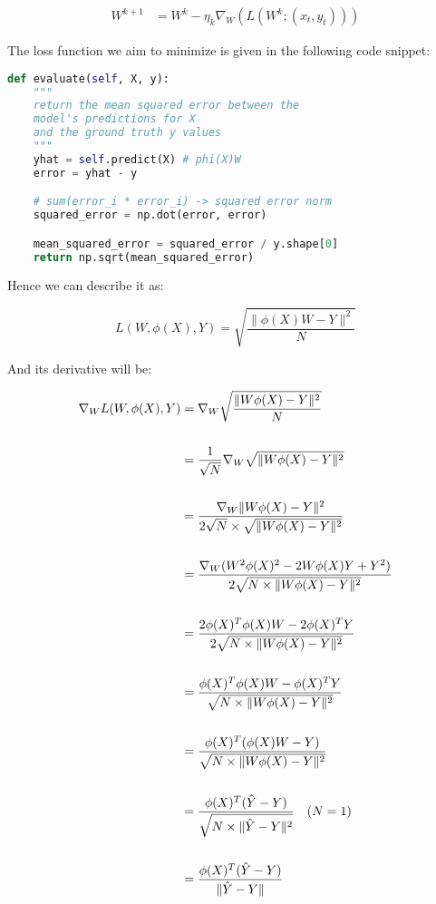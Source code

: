 \documentclass[10pt]{article}
\begin{document}
\begin{equation}
\begin{aligned}
W^{k+1} & {} = W^{k} - \eta_{k} \nabla_{W}(L(W^{k};(x_{t},y_{t})))
\end{aligned}
\end{equation}

The loss function we aim to minimize is given in the following code snippet:

\begin{lstlisting}[language=Python]
def evaluate(self, X, y):
    """
    return the mean squared error between the
    model's predictions for X
    and the ground truth y values
    """
    yhat = self.predict(X) # phi(X)W
    error = yhat - y

    # sum(error_i * error_i) -> squared error norm
    squared_error = np.dot(error, error)

    mean_squared_error = squared_error / y.shape[0]
    return np.sqrt(mean_squared_error)
\end{lstlisting}

Hence we can describe it as:

$$
L(W, \phi(X), Y) = \sqrt{\frac{\| \phi(X)W - Y \|^2}{N}}
$$

And its derivative will be:

\begin{equation}
\begin{aligned}
  \nabla_W L(W, \phi(X), Y) {} & = \nabla_W \sqrt{\frac{\| W\phi(X) - Y \|^2}{N}}
  \\ \\ &
  = \frac{1}{\sqrt{N}} \nabla_W \sqrt{\| W\phi(X) - Y \|^2}
  \\ \\ &
  = \frac{\nabla_W \| W\phi(X) - Y \|^2}{2\sqrt{N} \times \sqrt{\| W\phi(X) - Y \|^2}}
  \\ \\ &
  = \frac{\nabla_W (W^2 \phi(X)^2 - 2W\phi(X)Y + Y^2)}{2\sqrt{N \times \| W\phi(X) - Y \|^2}}
  \\ \\ &
  = \frac{2\phi(X)^T\phi(X)W - 2\phi(X)^TY}{2\sqrt{N \times \| W\phi(X) - Y \|^2}}
  \\ \\ &
  = \frac{\phi(X)^T\phi(X)W - \phi(X)^TY}{\sqrt{N \times \| W\phi(X) - Y \|^2}}
  \\ \\ &
  = \frac{\phi(X)^T(\phi(X)W - Y)}{\sqrt{N \times \| W\phi(X) - Y \|^2}}
  \\ \\ &
  = \frac{\phi(X)^T(\hat{Y} - Y)}{\sqrt{N \times \| \hat{Y} - Y \|^2}}  \quad\text(N = 1)
  \\ \\ &
  = \frac{\phi(X)^T(\hat{Y} - Y)}{\| \hat{Y} - Y \|}
\end{aligned}
\end{equation}
\end{document}
